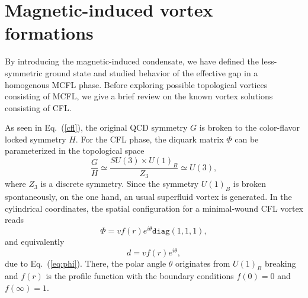 \section{Magnetic-induced vortex formations}
\label{sec:3}

By introducing the magnetic-induced condensate, we have defined the less-symmetric ground state and
studied behavior of the effective gap in a homogenous MCFL phase. Before exploring possible topological
vortices consisting of MCFL, we give a brief review on the known vortex solutions consisting of CFL.

As seen in Eq.~(\ref{cfl}), the original QCD symmetry $G$ is broken to
the color-flavor locked symmetry $H$.
For the CFL phase, the diquark matrix $\Phi$ can be parameterized in the
topological space
\begin{equation}
  \label{eq:cflvortexgroup}
  \frac{G}{H} \simeq \frac{SU(3) \times U(1)_B}{Z_3}  \simeq U(3),
\end{equation}
where $Z_3$ is a discrete symmetry.
Since the symmetry $U(1)_B$ is broken spontaneously, on the one hand, an usual superfluid vortex is generated.
In the cylindrical coordinates, the spatial configuration for a minimal-wound CFL vortex reads
\begin{equation}
  \label{eq:bvortexphi}
\Phi =vf(r)e^{i \theta} \texttt{diag}(1,1,1),
\end{equation}
and equivalently
\begin{equation}
 d = vf(r)e^{i\theta}, \label{eq:bvortex}\end{equation}
due to Eq.~(\ref{eq:phi}). There, the polar angle $\theta$ originates from $U(1)_B$ breaking and
$f(r)$ is the profile function with the boundary
conditions $f(0) = 0$ and $f(\infty) =1$.

